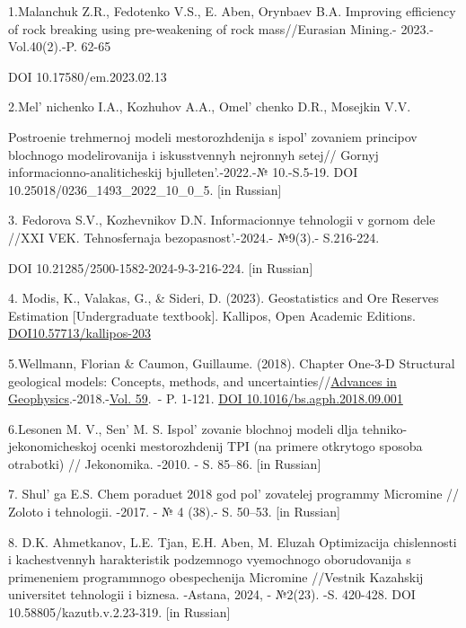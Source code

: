 \begin{references}

1.Malanchuk Z.R., Fedotenko V.S., E. Aben, Orynbaev B.A. Improving
efficiency of rock breaking using pre-weakening of rock mass//Eurasian
Mining.- 2023.-Vol.40(2).-P. 62-65

DOI 10.17580/em.2023.02.13

2.Mel' nichenko I.A., Kozhuhov A.A.,
Omel' chenko D.R., Mosejkin V.V.

Postroenie trehmernoj modeli mestorozhdenija s
ispol' zovaniem principov blochnogo modelirovanija i
iskusstvennyh nejronnyh setej// Gornyj informacionno-analiticheskij
bjulleten'.-2022.-№ 10.-S.5-19. DOI
10.25018/0236\_1493\_2022\_10\_0\_5. {[}in Russian{]}

3. Fedorova S.V., Kozhevnikov D.N. Informacionnye tehnologii v gornom
dele //XXI VEK. Tehnosfernaja bezopasnost'.-2024.-
№9(3).- S.216-224.

DOI 10.21285/2500-1582-2024-9-3-216-224. {[}in Russian{]}

4. Modis, K., Valakas, G., \& Sideri, D. (2023). Geostatistics and Ore
Reserves Estimation {[}Undergraduate textbook{]}. Kallipos, Open
Academic Editions.
\href{http://dx.doi.org/10.57713/kallipos-203}{DOI10.57713/kallipos-203}

5.Wellmann, Florian \& Caumon, Guillaume. (2018). Chapter One-3-D
Structural geological models: Concepts, methods, and
uncertainties//\href{https://www.sciencedirect.com/bookseries/advances-in-geophysics}{Advances
in
Geophysics}.-2018.-\href{https://www.sciencedirect.com/bookseries/advances-in-geophysics/vol/59/suppl/C}{Vol.
59}.~- P. 1-121.
\href{http://dx.doi.org/10.1016/bs.agph.2018.09.001}{DOI
10.1016/bs.agph.2018.09.001} \hl{}

6.Lesonen M. V., Sen'{} M. S.
Ispol' zovanie blochnoj modeli dlja
tehniko-jekonomicheskoj ocenki mestorozhdenij TPI (na primere otkrytogo
sposoba otrabotki) // Jekonomika. -2010. - S. 85--86. {[}in Russian{]}

7. Shul' ga E.S. Chem poraduet 2018 god
pol' zovatelej programmy Micromine // Zoloto i
tehnologii. -2017. - № 4 (38).- S. 50--53. {[}in Russian{]}

8. D.K. Ahmetkanov, L.E. Tjan, E.H. Aben, M. Eluzah Optimizacija
chislennosti i kachestvennyh harakteristik podzemnogo vyemochnogo
oborudovanija s primeneniem programmnogo obespechenija Micromine
//Vestnik Kazahskij universitet tehnologii i biznesa. -Astana, 2024, -
№2(23). -S. 420-428. DOI 10.58805/kazutb.v.2.23-319. {[}in Russian{]}


\end{references}

